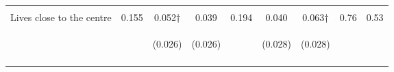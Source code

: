 \begin{table}[h!]
{\begin{tabular}{lcccccccc}
 & \begin{footnotesize}\end{footnotesize} & \begin{footnotesize}[0.017]\end{footnotesize} & \begin{footnotesize}[0.016]\end{footnotesize} & \begin{footnotesize}\end{footnotesize} & \begin{footnotesize}[0.505]\end{footnotesize} & \begin{footnotesize}[0.927]\end{footnotesize} & \begin{footnotesize}\end{footnotesize} & \begin{footnotesize}\end{footnotesize}\\
\noalign{\smallskip}Lives close to the centre & 0.155 & 0.052† & 0.039 & 0.194 & 0.040 & 0.063† & 0.76 & 0.53\\
 & \begin{footnotesize}\end{footnotesize} & \begin{footnotesize}(0.026)\end{footnotesize} & \begin{footnotesize}(0.026)\end{footnotesize} & \begin{footnotesize}\end{footnotesize} & \begin{footnotesize}(0.028)\end{footnotesize} & \begin{footnotesize}(0.028)\end{footnotesize} & \begin{footnotesize}\end{footnotesize} & \begin{footnotesize}\end{footnotesize}\\
 & \begin{footnotesize}\end{footnotesize} & \begin{footnotesize}[0.027]\end{footnotesize} & \begin{footnotesize}[0.034]\end{footnotesize} & \begin{footnotesize}\end{footnotesize} & \begin{footnotesize}[0.505]\end{footnotesize} & \begin{footnotesize}[0.136]\end{footnotesize} & \begin{footnotesize}\end{footnotesize} & \begin{footnotesize}\end{footnotesize}\\

\end{tabular}}
\end{table}
